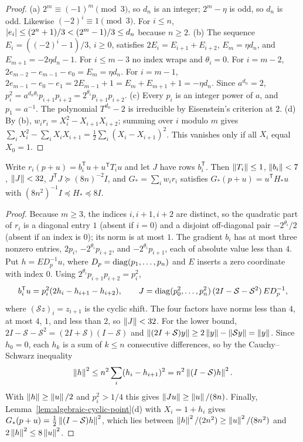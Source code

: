 \begin{proof}
(a) $2^m\equiv(-1)^m\pmod3$, so $d_n$ is an integer; $2^m-\eta$ is odd, so
$d_n$ is odd. Likewise $(-2)^i\equiv1\pmod3$. For $i\le n$,
$\left\lvert e_i\right\rvert\le(2^n+1)/3<(2^m-1)/3\le d_n$ because $n\ge2$.
(b) The sequence $E_i=((-2)^i-1)/3$, $i\ge0$, satisfies
$2E_i=E_{i+1}+E_{i+2}$, $E_m=\eta d_n$, and $E_{m+1}=-2\eta d_n-1$. For
$i\le m-3$ no index wraps and $\theta_i=0$. For $i=m-2$,
$2e_{m-2}-e_{m-1}-e_0=E_m=\eta d_n$. For $i=m-1$,
$2e_{m-1}-e_0-e_1=2E_{m-1}+1=E_m+E_{m+1}+1=-\eta d_n$. Since $a^{d_n}=2$,
$p_i^2=a^{d_n\theta_i}p_{i+1}p_{i+2}=2^{\theta_i}p_{i+1}p_{i+2}$.
(c) Every $p_i$ is an integer power of $a$, and $p_1=a^{-1}$. The polynomial
$T^{d_n}-2$ is irreducible by Eisenstein's criterion at $2$.
(d) By (b), $w_ir_i=X_i^2-X_{i+1}X_{i+2}$; summing over $i$ modulo $m$ gives
$\sum_iX_i^2-\sum_iX_iX_{i+1}=\frac12\sum_i(X_i-X_{i+1})^2$. This vanishes
only if all $X_i$ equal $X_0=1$.
\end{proof}

\begin{lemma}
\label{lem:algebraic-cyclic-data}
Write $r_i(p+u)=b_i^{\mathsf T}u+u^{\mathsf T}T_iu$ and let $J$ have rows
$b_i^{\mathsf T}$. Then $\left\lVert T_i\right\rVert\le1$, $\left\lVert b_i\right\rVert<7$, $\left\lVert J\right\rVert<32$,
$J^{\mathsf T}J\succeq(8n)^{-2}I$, and
$G_*=\sum_iw_ir_i$ satisfies $G_*(p+u)=u^{\mathsf T}H_*u$ with
$(8n^2)^{-1}I\preceq H_*\preceq8I$.
\end{lemma}

\begin{proof}
Because $m\ge3$, the indices $i,i+1,i+2$ are distinct, so the quadratic part
of $r_i$ is a diagonal entry $1$ (absent if $i=0$) and a disjoint off-diagonal
pair $-2^{\theta_i}/2$ (absent if an index is $0$); its norm is at most $1$.
The gradient $b_i$ has at most three nonzero entries, $2p_i$,
$-2^{\theta_i}p_{i+2}$, and $-2^{\theta_i}p_{i+1}$, each of absolute value less
than $4$. Put $h=ED_p^{-1}u$, where $D_p=\operatorname{diag}(p_1,\ldots,p_n)$ and $E$ inserts
a zero coordinate with index $0$. Using $2^{\theta_i}p_{i+1}p_{i+2}=p_i^2$,
\[
 b_i^{\mathsf T}u=p_i^2(2h_i-h_{i+1}-h_{i+2}),\qquad
 J=\operatorname{diag}(p_0^2,\ldots,p_n^2)\,(2I-\mathcal S-\mathcal S^2)\,ED_p^{-1},
\]
where $(\mathcal Sz)_i=z_{i+1}$ is the cyclic shift. The four factors have
norms less than $4$, at most $4$, $1$, and less than $2$, so $\left\lVert J\right\rVert<32$.
For the lower bound, $2I-\mathcal S-\mathcal S^2=(2I+\mathcal S)(I-\mathcal S)$
and $\left\lVert(2I+\mathcal S)y\right\rVert\ge2\left\lVert y\right\rVert-\left\lVert\mathcal Sy\right\rVert=\left\lVert y\right\rVert$. Since
$h_0=0$, each $h_k$ is a sum of $k\le n$ consecutive differences, so by the
Cauchy--Schwarz inequality
\begin{equation}
 \left\lVert h\right\rVert^2\le n^2\sum_i(h_i-h_{i+1})^2=n^2\left\lVert(I-\mathcal S)h\right\rVert^2 .
 \label{eq:algebraic-anchored}
\end{equation}
With $\left\lVert h\right\rVert\ge\left\lVert u\right\rVert/2$ and $p_i^2>1/4$ this gives
$\left\lVert Ju\right\rVert\ge\left\lVert u\right\rVert/(8n)$. Finally, Lemma~\ref{lem:algebraic-cyclic-point}(d)
with $X_i=1+h_i$ gives $G_*(p+u)=\tfrac12\left\lVert(I-\mathcal S)h\right\rVert^2$, which lies
between $\left\lVert h\right\rVert^2/(2n^2)\ge\left\lVert u\right\rVert^2/(8n^2)$ and $2\left\lVert h\right\rVert^2\le8\left\lVert u\right\rVert^2$.
\end{proof}


